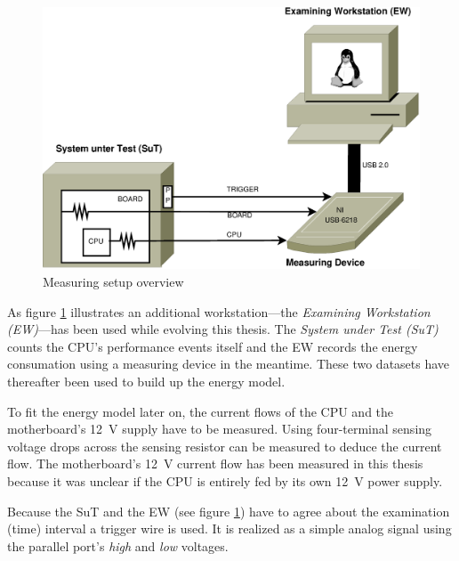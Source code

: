 \label{sec:design}


\label{sec:big-pic}

\begin{figure}
  \centering
    \includegraphics[width=\textwidth]{fig/measuring-overview.eps}
  \caption{Measuring setup overview}
  \label{fig:overview}
\end{figure}

As figure \ref{fig:overview} illustrates an additional workstation---the
\emph{Examining Workstation (EW)}---has been used while evolving this thesis.
The \emph{System under Test (SuT)} counts the CPU's performance events itself
and the EW records the energy consumation using a measuring device in the
meantime. These two datasets have thereafter been used to build up the energy
model.


\label{sec:measuring-setup}

To fit the energy model later on, the current flows of the CPU and the
motherboard's \SI{12}{\volt} supply have to be measured. Using four-terminal
sensing \cite{wiki:FTS} voltage drops across the sensing resistor can be
measured to deduce the current flow. The motherboard's \SI{12}{\volt} current
flow has been measured in this thesis because it was unclear if the CPU is
entirely fed by its own \SI{12}{\volt} power supply.

Because the SuT and the EW (see figure \ref{fig:overview}) have to agree about
the examination (time) interval a trigger wire is used. It is realized as a
simple analog signal using the parallel port's \emph{high} and \emph{low}
voltages.

